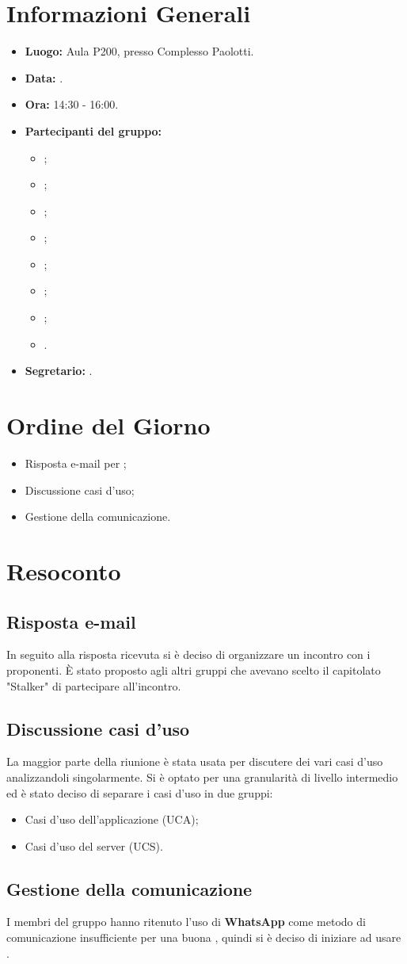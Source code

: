 \section{Informazioni Generali}
\begin{itemize}
\item \textbf{Luogo:} Aula P200, presso Complesso Paolotti.
\item \textbf{Data:} \Data.
\item \textbf{Ora:} 14:30 - 16:00.
\item \textbf{Partecipanti del gruppo:}
	\begin{itemize}
		\item \AT{}; 
		\item \BR{};
		\item \CE{}; 
		\item \DF{};
		\item \LD{};
		\item \MC{};
		\item \PF{};
		\item \SE{}.
	\end{itemize} 
\item \textbf{Segretario:} \DF{}.
\end{itemize}


\section{Ordine del Giorno}
\begin{itemize}
\item Risposta e-mail per \Proponente{};
\item Discussione casi d'uso;
\item Gestione della comunicazione.
\end{itemize}

\section{Resoconto}
\subsection{Risposta e-mail \Proponente{}}
In seguito alla risposta ricevuta si è deciso di organizzare un incontro con i proponenti.
È stato proposto agli altri gruppi che avevano scelto il capitolato "Stalker" di partecipare all'incontro. 

\subsection{Discussione casi d'uso}
La maggior parte della riunione è stata usata per discutere dei vari casi d'uso analizzandoli singolarmente.
Si è optato per una granularità di livello intermedio ed è stato deciso di separare i casi d'uso in due gruppi:
\begin{itemize}
\item Casi d'uso dell'applicazione (UCA);
\item Casi d'uso del server (UCS).
\end{itemize}


\subsection{Gestione della comunicazione}
I membri del gruppo hanno ritenuto l'uso di \textbf{WhatsApp} come metodo di comunicazione insufficiente per una buona , quindi si è deciso di iniziare ad usare .

\clearpage